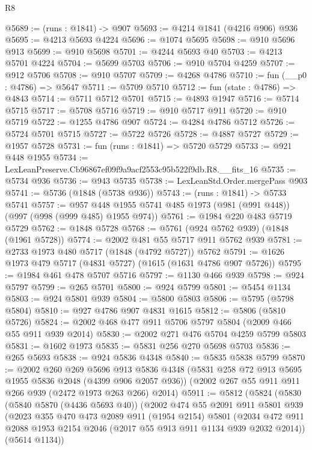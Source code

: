 \begin{lexlean}{R8}
\begin{coremodule}
@5689 := (runs : @1841) -> @907
@5693 := @4214 @1841 (@4216 @906) @936
@5695 := @4213 @5693 @4224
@5696 := @1074 @5695
@5698 := @910 @5696 @913
@5699 := @910 @5698
@5701 := @4244 @5693 @40
@5703 := @4213 @5701 @4224
@5704 := @5699 @5703
@5706 := @910 @5704 @4259
@5707 := @912 @5706
@5708 := @910 @5707
@5709 := @4268 @4786
@5710 := fun (__p0 : @4786) => @5647
@5711 := @5709 @5710
@5712 := fun (state : @4786) => @4843
@5714 := @5711 @5712 @5701
@5715 := @4893 @1947
@5716 := @5714 @5715
@5717 := @5708 @5716
@5719 := @910 @5717 @911
@5720 := @910 @5719
@5722 := @1255 @4786 @907
@5724 := @4284 @4786 @5712
@5726 := @5724 @5701 @5715
@5727 := @5722 @5726
@5728 := @4887 @5727
@5729 := @1957 @5728
@5731 := fun (runs : @1841) => @5720 @5729
@5733 := @921 @448 @1955
@5734 := LexLeanPreserve.Cb96867ef09f9a9acf2553c95b522f9db.R8.__fits_16
@5735 := @5734 @936
@5736 := @943 @5735
@5738 := LexLeanStd.Order.mergePass @903
@5741 := @5736 (@1848 (@5738 @936))
@5743 := (runs : @1841) -> @5733 @5741
@5757 := @957 @448 @1955 @5741 @485 @1973 (@981 (@991 @448)) (@997 (@998 (@999 @485) @1955 @974))
@5761 := @1984 @220 @483 @5719 @5729
@5762 := @1848 @5728
@5768 := @5761 (@924 @5762 @939) (@1848 (@1961 @5728))
@5774 := @2002 @481 @55 @5717 @911 @5762 @939
@5781 := @2733 @1973 @480 @5717 (@1848 (@4792 @5727)) @5762
@5791 := @1626 @1973 @479 @5717 (@4831 @5727) (@1615 (@1631 @4786 @907 @5726))
@5795 := @1984 @461 @478 @5707 @5716
@5797 := @1130 @466 @939
@5798 := @924 @5797
@5799 := @265 @5701
@5800 := @924 @5799
@5801 := @5454 @1134
@5803 := @924 @5801 @939
@5804 := @5800 @5803
@5806 := @5795 (@5798 @5804)
@5810 := @927 @4786 @907 @4831 @1615
@5812 := @5806 (@5810 @5726)
@5824 := @2002 @468 @477 @911 @5706 @5797 @5804 (@2009 @466 @55 @911 @939 @2014)
@5830 := @2002 @271 @476 @5704 @4259 @5799 @5803
@5831 := @1602 @1973
@5835 := @5831 @256 @270 @5698 @5703
@5836 := @265 @5693
@5838 := @924 @5836 @4348
@5840 := @5835 @5838 @5799
@5870 := @2002
    @260
    @269
    @5696
    @913
    @5836
    @4348
    (@5831 @258 @72 @913 @5695 @1955 @5836 @2048 (@4399 @906 @2057 @936))
    (@2002 @267 @55 @911 @911 @266 @939 (@2472 @1973 @263 @266) @2014)
@5911 := @5812
    (@5824
      (@5830
        (@5840 @5870 (@4436 @5693 @40))
        (@2002
          @474
          @55
          @2091
          @911
          @5801
          @939
          (@2023
            @355
            @470
            @473
            @2089
            @911
            (@1954 @2154)
            @5801
            (@2034 @472 @911 @2088 @1953 @2154 @2046 (@2017 @55 @913 @911 @1134 @939 @2032 @2014))
            (@5614 @1134))

\end{coremodule}
\end{lexlean}
